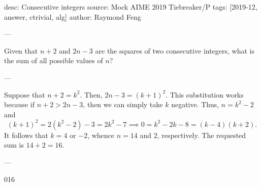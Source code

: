 desc: Consecutive integers
source: Mock AIME 2019 Tiebreaker/P
tags: [2019-12, answer, ctrivial, alg]
author: Raymond Feng

---

Given that $n+2$ and $2n-3$ are the squares of two consecutive integers, what is the sum of all possible values of $n$?

---

Suppose that $n+2=k^2$. Then, $2n-3=(k+1)^2$. This substitution works because if $n+2>2n-3$, then we can simply take $k$ negative. Thus, $n=k^2-2$ and \[(k+1)^2=2(k^2-2)-3=2k^2-7\implies 0=k^2-2k-8=(k-4)(k+2).\]
It follows that $k=4$ or $-2$, whence $n=14$ and $2$, respectively. The requested sum is $14+2=16$.

---

016
